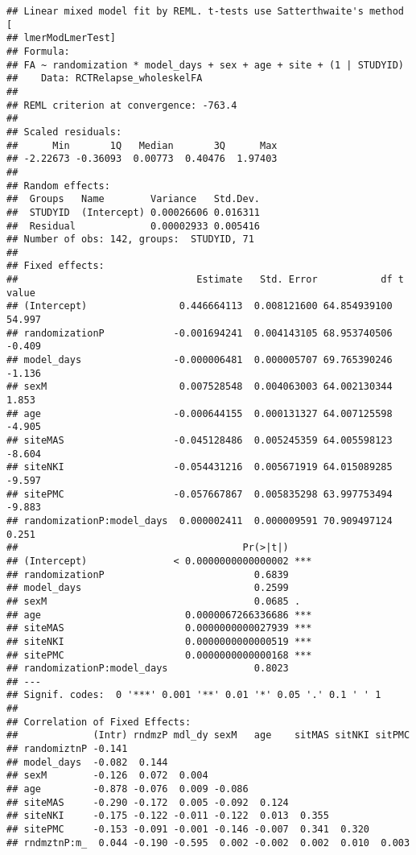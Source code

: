 \documentclass[]{article}
\theoremstyle{definition}
\theoremstyle{definition}
\theoremstyle{definition}
\theoremstyle{remark}
\begin{document}
\begin{verbatim}
## Linear mixed model fit by REML. t-tests use Satterthwaite's method [
## lmerModLmerTest]
## Formula: 
## FA ~ randomization * model_days + sex + age + site + (1 | STUDYID)
##    Data: RCTRelapse_wholeskelFA
## 
## REML criterion at convergence: -763.4
## 
## Scaled residuals: 
##      Min       1Q   Median       3Q      Max 
## -2.22673 -0.36093  0.00773  0.40476  1.97403 
## 
## Random effects:
##  Groups   Name        Variance   Std.Dev.
##  STUDYID  (Intercept) 0.00026606 0.016311
##  Residual             0.00002933 0.005416
## Number of obs: 142, groups:  STUDYID, 71
## 
## Fixed effects:
##                               Estimate   Std. Error           df t value
## (Intercept)                0.446664113  0.008121600 64.854939100  54.997
## randomizationP            -0.001694241  0.004143105 68.953740506  -0.409
## model_days                -0.000006481  0.000005707 69.765390246  -1.136
## sexM                       0.007528548  0.004063003 64.002130344   1.853
## age                       -0.000644155  0.000131327 64.007125598  -4.905
## siteMAS                   -0.045128486  0.005245359 64.005598123  -8.604
## siteNKI                   -0.054431216  0.005671919 64.015089285  -9.597
## sitePMC                   -0.057667867  0.005835298 63.997753494  -9.883
## randomizationP:model_days  0.000002411  0.000009591 70.909497124   0.251
##                                       Pr(>|t|)    
## (Intercept)               < 0.0000000000000002 ***
## randomizationP                          0.6839    
## model_days                              0.2599    
## sexM                                    0.0685 .  
## age                         0.0000067266336686 ***
## siteMAS                     0.0000000000027939 ***
## siteNKI                     0.0000000000000519 ***
## sitePMC                     0.0000000000000168 ***
## randomizationP:model_days               0.8023    
## ---
## Signif. codes:  0 '***' 0.001 '**' 0.01 '*' 0.05 '.' 0.1 ' ' 1
## 
## Correlation of Fixed Effects:
##             (Intr) rndmzP mdl_dy sexM   age    sitMAS sitNKI sitPMC
## randomiztnP -0.141                                                 
## model_days  -0.082  0.144                                          
## sexM        -0.126  0.072  0.004                                   
## age         -0.878 -0.076  0.009 -0.086                            
## siteMAS     -0.290 -0.172  0.005 -0.092  0.124                     
## siteNKI     -0.175 -0.122 -0.011 -0.122  0.013  0.355              
## sitePMC     -0.153 -0.091 -0.001 -0.146 -0.007  0.341  0.320       
## rndmztnP:m_  0.044 -0.190 -0.595  0.002 -0.002  0.002  0.010  0.003
\end{verbatim}
\end{document}
